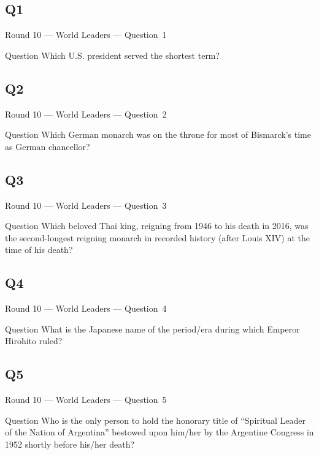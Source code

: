\documentclass[11pt]{beamer}
\begin{document}
\subsection*{Q1}
\begin{frame}[t]{Round 10 --- World Leaders --- \mbox{Question 1}}
\vspace{-0.5em}
\begin{block}{Question}
Which U.S. president served the shortest term?
\end{block}
\end{frame}
\subsection*{Q2}
\begin{frame}[t]{Round 10 --- World Leaders --- \mbox{Question 2}}
\vspace{-0.5em}
\begin{block}{Question}
Which German monarch was on the throne for most of Bismarck's time as German chancellor?
\end{block}
\end{frame}
\subsection*{Q3}
\begin{frame}[t]{Round 10 --- World Leaders --- \mbox{Question 3}}
\vspace{-0.5em}
\begin{block}{Question}
Which beloved Thai king, reigning from 1946 to his death in 2016, was the second-longest reigning monarch in recorded history (after Louis XIV) at the time of his death?
\end{block}
\end{frame}
\subsection*{Q4}
\begin{frame}[t]{Round 10 --- World Leaders --- \mbox{Question 4}}
\vspace{-0.5em}
\begin{block}{Question}
What is the Japanese name of the period/era during which Emperor Hirohito ruled?
\end{block}
\end{frame}
\subsection*{Q5}
\begin{frame}[t]{Round 10 --- World Leaders --- \mbox{Question 5}}
\vspace{-0.5em}
\begin{block}{Question}
Who is the only person to hold the honorary title of ``Spiritual Leader of the Nation of Argentina'' bestowed upon him/her by the Argentine Congress in 1952 shortly before his/her death?
\end{block}
\end{frame}
\end{document}
